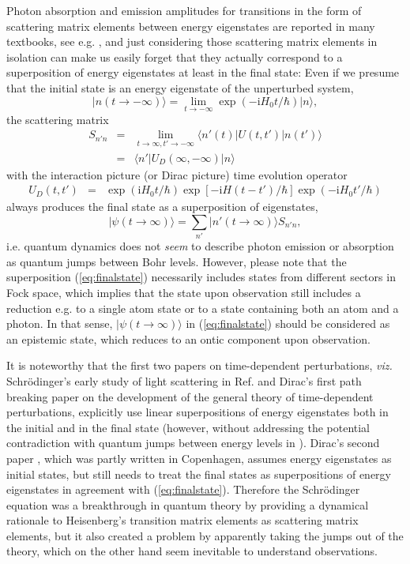 \documentclass[final,3p,12pt]{elsarticle3}
\begin{document}
Photon absorption and emission amplitudes for transitions in the form of 
scattering matrix elements between energy eigenstates are reported in many 
textbooks, see e.g. \cite{dirac2,heitler,merzbacher,ballentine2,louisqm,rdqm}, 
and just considering those scattering matrix elements in isolation can make 
us easily forget that they actually correspond to a superposition of energy 
eigenstates at least in the final state: Even if we presume that the initial 
state is an energy eigenstate of the unperturbed system,
\[
\bm{|}n(t\to-\infty)\bm{\rangle}=\lim_{t\to-\infty}\exp(-\mathrm{i}H_0t/\hbar)\bm{|}n\bm{\rangle},
\]
the scattering matrix
\begin{eqnarray}\nonumber
S_{n'n}&=&\lim_{t\to\infty,t'\to-\infty}\bm{\langle} n'(t)\bm{|}U(t,t')\bm{|}n(t')\bm{\rangle}
\\  \label{eq:smatrix1}
&=&\bm{\langle} n'\bm{|}U_D(\infty,-\infty)\bm{|}n\bm{\rangle}
\end{eqnarray}
with the interaction picture (or Dirac picture) time evolution operator
\begin{eqnarray}\nonumber 
U_D(t,t')&=&
\exp(\mathrm{i}H_0t/\hbar)
\exp[-\mathrm{i}H(t-t')/\hbar]
\label{eq:UD}
\exp(-\mathrm{i}H_0t'/\hbar)
\end{eqnarray}
always produces the final state as a superposition of eigenstates,
\begin{equation}\label{eq:finalstate}
\bm{|}\psi(t\to\infty)\bm{\rangle}=\sum_{n'}\bm{|}n'(t\to\infty)\bm{\rangle} S_{n'n},
\end{equation}
i.e. quantum dynamics does not {\it seem} to describe photon emission or 
absorption as quantum jumps between Bohr levels. However, 
please note that the superposition (\ref{eq:finalstate}) necessarily includes 
states from different sectors in Fock space, which implies that
the state upon observation still includes a reduction e.g. to a single atom
state or to a state containing both an atom and a photon. In that 
sense, $\bm{|}\psi(t\to\infty)\bm{\rangle}$ in (\ref{eq:finalstate}) should be 
considered as an epistemic state, which reduces to an ontic component 
upon observation.

It is noteworthy that the first two papers on time-dependent
perturbations, {\it viz.} Schr\"odinger's early study of light scattering
in Ref. \cite{erwin} and Dirac's first path breaking paper \cite{dirac1a} 
on the development of the general theory of time-dependent perturbations, 
explicitly use linear superpositions of energy eigenstates both in the 
initial and in the final state (however, without addressing the potential 
contradiction with quantum jumps between energy levels in \cite{dirac1a}). 
Dirac's second paper \cite{dirac1b}, which was partly written in Copenhagen,
assumes energy eigenstates as initial states, but still needs to treat
the final states as superpositions of energy eigenstates in agreement
with (\ref{eq:finalstate}).
Therefore the Schr\"odinger equation was a breakthrough in quantum theory 
by providing a dynamical rationale to Heisenberg's transition matrix 
elements as scattering matrix elements, but it also created a problem
by apparently taking the jumps out of the theory, which on the other 
hand seem inevitable to understand observations.
\end{document}
